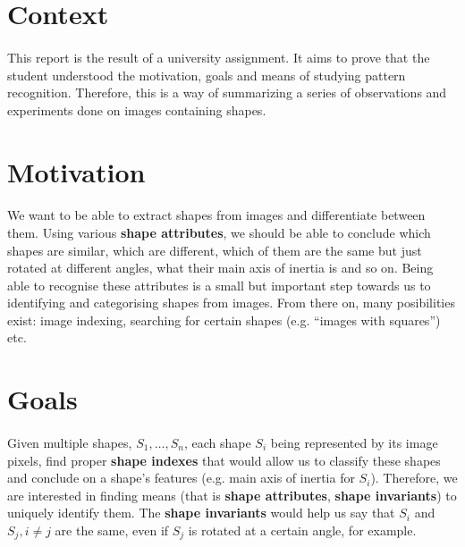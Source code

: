 \section{Context}
\paragraph{}
This report is the result of a university assignment. It aims to prove that the student understood the motivation, goals and means of studying pattern recognition. Therefore, this is a way of summarizing a series of observations and experiments done on images containing shapes.

\section{Motivation}
\paragraph{}
We want to be able to extract shapes from images and differentiate between them.
Using various \textbf{shape attributes}, we should be able to conclude which shapes are similar, which are different, which of them are the same but just rotated at different angles, what their main axis of inertia is and so on.
Being able to recognise these attributes is a small but important step towards us to identifying and categorising shapes from images.
From there on, many posibilities exist: image indexing, searching for certain shapes (e.g. ``images with squares'') etc.


\section{Goals}
\paragraph{}
Given multiple shapes, $S_1, \dots, S_n$, each shape $S_i$ being represented by its image pixels, find proper \textbf{shape indexes} that would allow us to classify these shapes and conclude on a shape's features (e.g. main axis of inertia for $S_i$). Therefore, we are interested in finding means (that is \textbf{shape attributes}, \textbf{shape invariants}) to uniquely identify them. The \textbf{shape invariants} would help us say that $S_i$ and $S_j, i \neq j$ are the same, even if $S_j$ is rotated at a certain angle, for example.